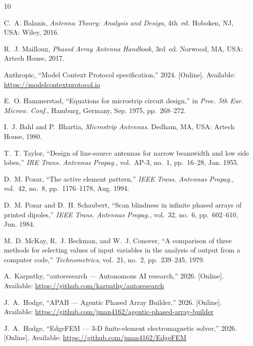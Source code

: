 \documentclass[journal]{IEEEtran}
\begin{document}
\begin{thebibliography}{10}

C.~A. Balanis, \emph{Antenna Theory: Analysis and Design}, 4th~ed.
Hoboken, NJ, USA: Wiley, 2016.

R.~J. Mailloux, \emph{Phased Array Antenna Handbook}, 3rd~ed.
Norwood, MA, USA: Artech House, 2017.

Anthropic, ``Model Context Protocol specification,'' 2024. [Online].
Available: \url{https://modelcontextprotocol.io}

E.~O. Hammerstad, ``Equations for microstrip circuit design,'' in
\emph{Proc. 5th Eur. Microw. Conf.}, Hamburg, Germany, Sep. 1975,
pp.~268--272.

I.~J. Bahl and P.~Bhartia, \emph{Microstrip Antennas}.
Dedham, MA, USA: Artech House, 1980.

T.~T. Taylor, ``Design of line-source antennas for narrow beamwidth
and low side lobes,'' \emph{IRE Trans. Antennas Propag.}, vol.~AP-3,
no.~1, pp.~16--28, Jan. 1955.

D.~M. Pozar, ``The active element pattern,'' \emph{IEEE Trans.
Antennas Propag.}, vol.~42, no.~8, pp.~1176--1178, Aug. 1994.

D.~M. Pozar and D.~H. Schaubert, ``Scan blindness in infinite phased
arrays of printed dipoles,'' \emph{IEEE Trans. Antennas Propag.},
vol.~32, no.~6, pp.~602--610, Jun. 1984.

M.~D. McKay, R.~J. Beckman, and W.~J. Conover, ``A comparison of
three methods for selecting values of input variables in the analysis
of output from a computer code,'' \emph{Technometrics}, vol.~21,
no.~2, pp.~239--245, 1979.

A.~Karpathy, ``autoresearch --- Autonomous AI research,'' 2026.
[Online]. Available: \url{https://github.com/karpathy/autoresearch}

J.~A.~Hodge, ``APAB --- Agentic Phased Array Builder,'' 2026. [Online].
Available: \protect\url{https://github.com/jman4162/agentic-phased-array-builder}

J.~A.~Hodge, ``EdgeFEM --- 3-D finite-element electromagnetic solver,''
2026. [Online]. Available: \url{https://github.com/jman4162/EdgeFEM}

\end{thebibliography}
\end{document}
